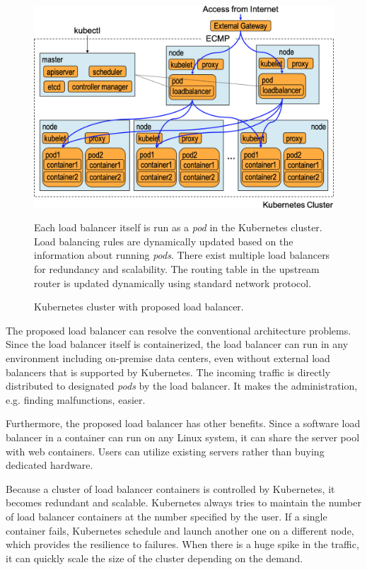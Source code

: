 \begin{figure}[h]
  \begin{center}
  \includegraphics[width=0.8\columnwidth]{Figs/K8sProposed}
  \caption{Kubernetes cluster with proposed load balancer.}
  \label{fig:K8sProposed}
  \begin{minipage}{0.9\columnwidth}
  Each load balancer itself is run as a {\em pod} in the Kubernetes cluster. 
  Load balancing rules are dynamically updated based on the information about running {\em pods}.
  There exist multiple load balancers for redundancy and scalability.
  The routing table in the upstream router is updated dynamically using standard network protocol.
  \end{minipage}
  \end{center}
\end{figure}

The proposed load balancer can resolve the conventional architecture problems.
Since the load balancer itself is containerized, the load balancer can run in any environment including on-premise data centers,
even without external load balancers that is supported by Kubernetes.
The incoming traffic is directly distributed to designated {\em pods} by the load balancer.
It makes the administration, e.g. finding malfunctions, easier.

Furthermore, the proposed load balancer has other benefits.
Since a software load balancer in a container can run on any Linux system, it can share the server pool with web containers.
Users can utilize existing servers rather than buying dedicated hardware.

Because a cluster of load balancer containers is controlled by Kubernetes, it becomes redundant and scalable.
Kubernetes always tries to maintain the number of load balancer containers at the number specified by the user.
If a single container fails, Kubernetes schedule and launch another one on a different node, which provides the resilience to failures.
When there is a huge spike in the traffic, it can quickly scale the size of the cluster depending on the demand.

